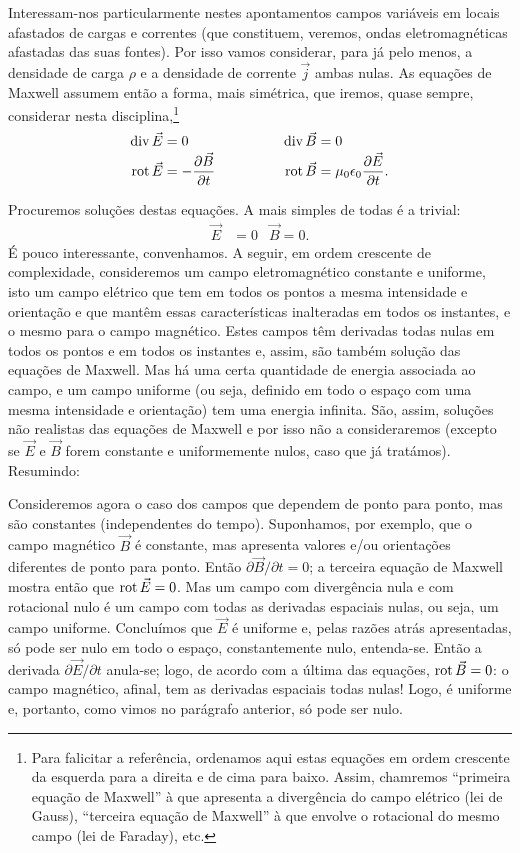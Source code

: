 Interessam-nos particularmente nestes apontamentos campos variáveis em locais
afastados de cargas e correntes (que constituem, veremos, ondas eletromagnéticas
afastadas das suas fontes). Por isso vamos considerar, para já pelo menos, a
densidade de carga $\rho$ e a densidade de corrente $\vec j$ ambas nulas. As
equações de Maxwell assumem então a forma, mais simétrica, que iremos, quase
sempre, considerar nesta disciplina,\footnote{Para falicitar a referência,
  ordenamos aqui estas equações em ordem crescente da esquerda para a direita e
  de cima para baixo. Assim, chamremos ``primeira equação de Maxwell'' à que
  apresenta a divergência do campo elétrico (lei de Gauss), ``terceira equação
  de Maxwell'' à que envolve o rotacional do mesmo campo (lei de Faraday), etc.}
\begin{equation}\label{eq:meqs}
  \begin{aligned}
    \div\vec E&=0& \div\vec B&=0\\
    \rot\vec E&=-\pd{\vec B}{t}& \qquad\qquad
      \rot\vec B&=\mu_0\epsilon_0\pd{\vec E}{t}.
  \end{aligned}
\end{equation}

Procuremos soluções destas equações. A mais simples de todas é a trivial:
\begin{align*}
  \vec E&=0&\vec B=0.
\end{align*}
É pouco interessante, convenhamos. A seguir, em ordem crescente de complexidade,
consideremos um campo eletromagnético constante e uniforme, isto um campo
elétrico que tem em todos os pontos a mesma intensidade e orientação e que
mantêm essas características inalteradas em todos os instantes, e o mesmo para o
campo magnético. Estes campos têm derivadas todas nulas em todos os pontos e em
todos os instantes e, assim, são também solução das equações de Maxwell. Mas há
uma certa quantidade de energia associada ao campo, e um campo uniforme (ou
seja, definido em todo o espaço com uma mesma intensidade e orientação) tem uma
energia infinita. São, assim, soluções não realistas das equações de
Maxwell e por isso não a consideraremos (excepto se $\vec E$ e $\vec B$ forem
constante e uniformemente nulos, caso que já tratámos). Resumindo:

Consideremos agora o caso dos campos que dependem de ponto para ponto, mas são
constantes (independentes do tempo). Suponhamos, por exemplo, que o campo
magnético $\vec B$ é constante, mas apresenta valores e/ou orientações
diferentes de ponto para ponto. Então $\partial \vec B/\partial t=0$; a terceira
equação de Maxwell mostra então que $\rot \vec E=0$. Mas um campo com
divergência nula e com rotacional nulo é um campo com todas as derivadas
espaciais nulas, ou seja, um campo uniforme. Concluímos que $\vec E$ é uniforme
e, pelas razões atrás apresentadas, só pode ser nulo em todo o espaço,
constantemente nulo, entenda-se. Então a derivada $\partial \vec E/\partial t$
anula-se; logo, de acordo com a última das equações, $\rot \vec B=0$: o campo
magnético, afinal, tem as derivadas espaciais todas nulas! Logo, é uniforme e,
portanto, como vimos no parágrafo anterior, só pode ser nulo.

